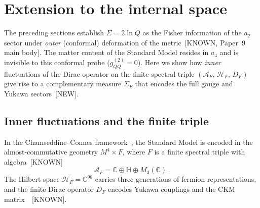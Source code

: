 %
%

\section{Extension to the internal space}
\label{sec:AF}

The preceding sections establish $\Sigma = 2\ln Q$ as the
Fisher information of the $a_2$ sector under
\emph{outer} (conformal) deformation of the
metric~[KNOWN, Paper~9 main body].
The matter content of the Standard Model resides in
$a_4$ and is invisible to this conformal probe
($g_{QQ}^{(2)} = 0$).
Here we show how \emph{inner} fluctuations of
the Dirac operator on the finite spectral triple
$(\mathcal{A}_F,\, \mathcal{H}_F,\, D_F)$
give rise to a complementary measure
$\Sigma_F$ that encodes the full gauge and
Yukawa sectors~[NEW].


\subsection{Inner fluctuations and the finite triple}
\label{sec:inner}

In the Chamseddine--Connes
framework~\cite{CC1996,vS2024}, the Standard Model
is encoded in the almost-commutative geometry
$M^4 \times F$, where $F$ is a finite
spectral triple with algebra~[KNOWN]
\begin{equation}\label{eq:AF}
  \mathcal{A}_F
  = \mathbb{C} \oplus \mathbb{H}
    \oplus M_3(\mathbb{C})\,.
\end{equation}
The Hilbert space $\mathcal{H}_F
= \mathbb{C}^{96}$ carries three generations
of fermion representations, and the finite Dirac
operator $D_F$ encodes Yukawa couplings and
the CKM matrix~\cite{vS2024}~[KNOWN].

